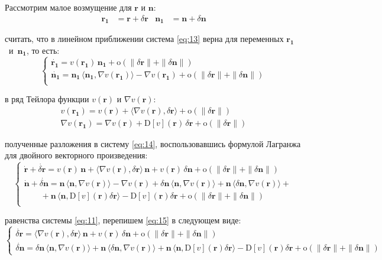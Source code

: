 \documentclass[12pt, cleqn, a4paper]{article}
\newcommand{\bfv}[1]{\mathbf{#1}}
\newcommand{\dd}[1]{\dot{#1}}
\newcommand{\dv}[1]{\nabla v(#1)}
\newcommand{\ddv}[1]{\mathrm{D}[v](#1)}
\newcommand{\dr}{\delta \bfv{r}}
\newcommand{\dn}{\delta \bfv{n}}
\newcommand{\om}[1]{\mathrm{o}(#1)}
\newcommand{\dprod}[2]{\langle #1, #2 \rangle}
\begin{document}
Рассмотрим малое возмущение для $\bfv{r}$ и $\bfv{n}$:
\begin{align*}
\bfv{r_1} &= \bfv{r} + \dr   &   \bfv{n_1} &= \bfv{n} + \dn
\end{align*}

 считать, что в линейном приближении система \eqref{eq:13} верна для переменных $\bfv{r_1}$~и~$\bfv{n_1}$, то есть: 
\begin{equation} \label{eq:14}
\begin{cases}
\dd{\bfv{r_1}} = v(\bfv{r_1})\,\bfv{n_1} + \om{\|\dr\| + \|\dn\|}\\
\dd{\bfv{n_1}} = \bfv{n_1}\,\dprod{\bfv{n_1}}{\dv{\bfv{r_1}}} - \dv{\bfv{r_1}} + \om{\|\dr\| + \|\dn\|}\\
\end{cases}
\end{equation}

 в ряд Тейлора функции $v(\bfv{r})$ и $\dv{\bfv{r}}$:
\begin{gather*} 
v(\bfv{r_1}) = v(\bfv{r}) + \dprod{\dv{\bfv{r}}}{\dr} + \om{\|\dr\|}\\ 
\dv{\bfv{r_1}} = \dv{\bfv{r}} + \ddv{\bfv{r}}\,\dr + \om{\|\dr\|}
\end{gather*}

 полученные разложения в систему \eqref{eq:14}, воспользовавшись формулой Лагранжа для двойного векторного произведения: 
\begin{equation} \label{eq:15}
\begin{cases}
\dd{\bfv{r}} + \dd{\dr} = v(\bfv{r})\,\bfv{n} + \dprod{\dv{\bfv{r}}}{\dr}\,\bfv{n} + v(\bfv{r})\,\dn + \om{\|\dr\| + \|\dn\|}\\
\dd{\bfv{n}} + \dd{\dn} = \bfv{n}\,\dprod{\bfv{n}}{\dv{\bfv{r}}} - \dv{\bfv{r}} + \dn\,\dprod{\bfv{n}}{\dv{\bfv{r}}} + \bfv{n}\,\dprod{\dn}{\dv{\bfv{r}}} + \\ 
\qquad + \bfv{n}\,\dprod{\bfv{n}}{\ddv{\bfv{r}}\dr} - \ddv{\bfv{r}}\dr + \om{\|\dr\| + \|\dn\|}\\
\end{cases}
\end{equation}

 равенства системы \eqref{eq:11}, перепишем \eqref{eq:15} в следующем виде:
\begin{equation*}
\begin{cases}
\dd{\dr} = \dprod{\dv{\bfv{r}}}{\dr}\,\bfv{n} + v(\bfv{r})\,\dn + \om{\|\dr\| + \|\dn\|}\\
\dd{\dn} = \dn\,\dprod{\bfv{n}}{\dv{\bfv{r}}} + \bfv{n}\,\dprod{\dn}{\dv{\bfv{r}}} + \bfv{n}\,\dprod{\bfv{n}}{\ddv{\bfv{r}}\dr} - \ddv{\bfv{r}}\dr + \om{\|\dr\| + \|\dn\|}
\end{cases}
\end{equation*}
\end{document}

